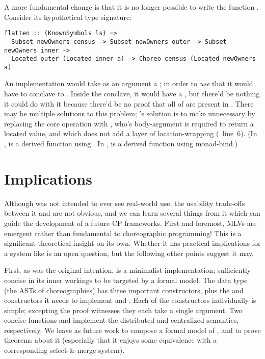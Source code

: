 A more fundamental change is that it is no longer possible to write the function .
Consider its hypothetical type signature:
\begin{verbatim}
flatten :: (KnownSymbols ls) =>
  Subset newOwners census -> Subset newOwners outer -> Subset newOwners inner ->
  Located outer (Located inner a) -> Choreo census (Located newOwners a)
\end{verbatim}
An implementation would take as an argument a ;
in order to \emph{use} that it would have to conclave to .
Inside the conclave, it would have a ,
but there'd be nothing it could do with it because there'd be no proof that all of  are present in .
There may be multiple solutions to this problem; \minichor's solution is to make  unnecessary
by replacing the core operation  with ,
who's body-argument is required to return a located value, and which does not add a layer of location-wrapping
(~line~6).
(In \MultiChor,  is a derived function using .
In \minichor,  is a derived function using monad-bind.)


\section{Implications}
\label{sec:minichor-implications}
Although \minichor was not intended to ever see real-world use,
the usability trade-offs between it and \MultiChor are not obvious,
and we can learn several things from it which can guide the development of a future CP frameworks.
First and foremost, MLVs are emergent rather than fundamental to choreographic programming!
This is a significant theoretical insight on its own.
Whether it has practical implications for a system like \MultiChor is an open question,
but the following other points suggest it may.

First, as was the original intention, \minichor is a minimalist implementation;
sufficiently concise in its inner workings to be targeted by a formal model.
The  data type (the ASTs of choreographies) has three important constructors,
plus the  and  constructors it needs to implement  and .
Each of the constructors individually is simple;
excepting the proof witnesses they each take a single argument.
Two concise functions  and  implement the distributed and centralized semantics, respectively.
We leave as future work to compose a formal model of \minichor,
and to prove theorems about it
(especially that it enjoys some equivalence with a corresponding select-\&-merge system).
 
